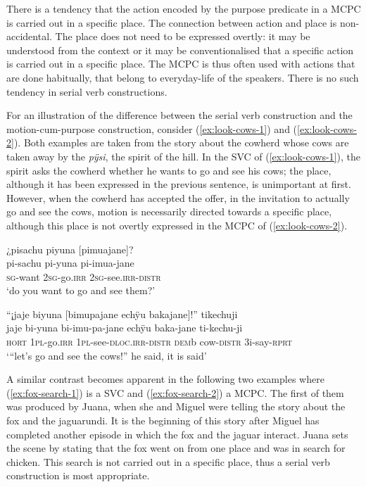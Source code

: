 There is a tendency that the action encoded by the purpose predicate in a MCPC is carried out in a specific place. The connection between action and place is non-accidental. The place does not need to be expressed overtly: it may be understood from the context or it may be conventionalised that a specific action is carried out in a specific place. The MCPC is thus often used with actions that are done habitually, that belong to everyday-life of the speakers. There is no such tendency in serial verb constructions. 

\largerpage
For an illustration of the difference between the serial verb construction and the motion-cum-purpose construction, consider (\ref{ex:look-cows-1}) and (\ref{ex:look-cows-2}). Both examples are taken from the story about the cowherd whose cows are taken away by the \textit{pÿsi}, the spirit of the hill. In the SVC of (\ref{ex:look-cows-1}), the spirit asks the cowherd whether he wants to go and see his cows; the place, although it has been expressed in the previous sentence, is unimportant at first. However, when the cowherd has accepted the offer, in the invitation to actually go and see the cows, motion is necessarily directed towards a specific place, although this place is not overtly expressed in the MCPC of (\ref{ex:look-cows-2}).

\ea\label{ex:look-cows-1}
\begingl
\glpreamble ¿pisachu piyuna \textup{[}pimuajane\textup{]}?\\
\gla pi-sachu pi-yuna pi-imua-jane\\ 
\textsc{sg}-want 2\textsc{sg}-go.\textsc{irr} 2\textsc{sg}-see.\textsc{irr}-\textsc{distr}\\ 
\glft ‘do you want to go and see them?’
\trailingcitation{[mxx-n151017l-1.35]}
\xe


\ea\label{ex:look-cows-2}
\begingl
\glpreamble “¡jaje biyuna \textup{[}bimupajane echÿu bakajane\textup{]}!” tikechuji\\
\gla jaje bi-yuna bi-imu-pa-jane echÿu baka-jane ti-kechu-ji\\ 
\glb \textsc{hort} 1\textsc{pl}-go.\textsc{irr} 1\textsc{pl}-see-\textsc{dloc.irr}-\textsc{distr} \textsc{dem}b cow-\textsc{distr} 3i-say-\textsc{rprt}\\ 
\glft ‘“let’s go and see the cows!” he said, it is said’
\trailingcitation{[mxx-n151017l-1.38]}
\xe

\largerpage
A similar contrast becomes apparent in the following two examples where (\ref{ex:fox-search-1}) is a SVC and (\ref{ex:fox-search-2}) a MCPC. The first of them was produced by Juana, when she and Miguel were telling the story about the fox and the jaguarundi. It is the beginning of this story after Miguel has completed another episode in which the fox and the jaguar interact. Juana sets the scene by stating that the fox went on from one place and was in search for chicken. This search is not carried out in a specific place, thus a serial verb construction is most appropriate.

